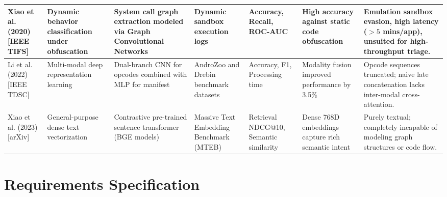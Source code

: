 \documentclass[12pt,a4paper,oneside]{report}
\begin{document}
\begin{landscape}
\begin{longtable}{|p{2.1cm}|p{2.5cm}|p{3.3cm}|p{2.4cm}|p{2.6cm}|p{2.8cm}|p{3.3cm}|}
Xiao et al. (2020) \cite{ref8} [IEEE TIFS] & Dynamic behavior classification under obfuscation & System call graph extraction modeled via Graph Convolutional Networks & Dynamic sandbox execution logs & Accuracy, Recall, ROC-AUC & High accuracy against static code obfuscation & Emulation sandbox evasion, high latency ($>5$ mins/app), unsuited for high-throughput triage.\\\hline

Li et al. (2022) \cite{ref9} [IEEE TDSC] & Multi-modal deep representation learning & Dual-branch CNN for opcodes combined with MLP for manifest & AndroZoo and Drebin benchmark datasets & Accuracy, F1, Processing time & Modality fusion improved performance by 3.5\% & Opcode sequences truncated; naive late concatenation lacks inter-modal cross-attention.\\\hline

Xiao et al. (2023) \cite{ref10} [arXiv] & General-purpose dense text vectorization & Contrastive pre-trained sentence transformer (BGE models) & Massive Text Embedding Benchmark (MTEB) & Retrieval NDCG@10, Semantic similarity & Dense 768D embeddings capture rich semantic intent & Purely textual; completely incapable of modeling graph structures or code flow.\\\hline

\end{longtable}\endgroup
\end{landscape}
\clearpage

\chapter{Requirements Specification}
\end{document}
